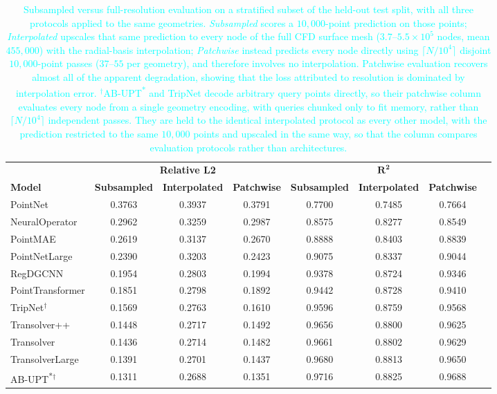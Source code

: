 \begin{table}[h!]
\centering
\small
\caption{\textcolor{cyan}{Subsampled versus full-resolution evaluation on a stratified subset of the
held-out test split, with all three protocols applied to the same geometries. \emph{Subsampled}
scores a $10{,}000$-point prediction on those points; \emph{Interpolated} upscales that same
prediction to every node of the full CFD surface mesh ($3.7$--$5.5\times10^{5}$ nodes, mean
$455{,}000$) with the radial-basis interpolation;
\emph{Patchwise} instead predicts every node directly using $\lceil N/10^4 \rceil$ disjoint
$10{,}000$-point passes ($37$--$55$ per geometry), and therefore involves no interpolation.
Patchwise evaluation recovers almost all of the apparent degradation, showing that the loss attributed to resolution is dominated by interpolation error.
$^{\dagger}$AB-UPT\textsuperscript{*} and TripNet decode arbitrary query points directly, so their
patchwise column evaluates every node from a single geometry encoding, with queries chunked only to
fit memory, rather than $\lceil N/10^4 \rceil$ independent passes. They are held to the identical
interpolated protocol as every other model, with the prediction restricted to the same $10{,}000$
points and upscaled in the same way, so that the column compares evaluation protocols rather than
architectures.}}
\label{tab:surface_fullmesh_comparison}
\setlength{\tabcolsep}{6pt}
\renewcommand{\arraystretch}{1.1}
\begin{tabular}{lccccccc}
\toprule
& \multicolumn{3}{c}{\textbf{Relative L2}} & \multicolumn{3}{c}{$\mathbf{R^2}$} \\
\cmidrule(lr){2-4}\cmidrule(lr){5-7}
\textbf{Model} & \textbf{Subsampled} & \textbf{Interpolated} & \textbf{Patchwise}
               & \textbf{Subsampled} & \textbf{Interpolated} & \textbf{Patchwise} \\
\midrule
PointNet & 0.3763 & 0.3937 & 0.3791 & 0.7700 & 0.7485 & 0.7664 \\
NeuralOperator & 0.2962 & 0.3259 & 0.2987 & 0.8575 & 0.8277 & 0.8549 \\
PointMAE & 0.2619 & 0.3137 & 0.2670 & 0.8888 & 0.8403 & 0.8839 \\
PointNetLarge & 0.2390 & 0.3203 & 0.2423 & 0.9075 & 0.8337 & 0.9044 \\
RegDGCNN & 0.1954 & 0.2803 & 0.1994 & 0.9378 & 0.8724 & 0.9346 \\
PointTransformer & 0.1851 & 0.2798 & 0.1892 & 0.9442 & 0.8728 & 0.9410 \\
TripNet$^{\dagger}$ & 0.1569 & 0.2763 & 0.1610 & 0.9596 & 0.8759 & 0.9568 \\
Transolver++ & 0.1448 & 0.2717 & 0.1492 & 0.9656 & 0.8800 & 0.9625 \\
Transolver & 0.1436 & 0.2714 & 0.1482 & 0.9661 & 0.8802 & 0.9629 \\
TransolverLarge & 0.1391 & 0.2701 & 0.1437 & 0.9680 & 0.8813 & 0.9650 \\
AB-UPT\textsuperscript{*}$^{\dagger}$ & 0.1311 & 0.2688 & 0.1351 & 0.9716 & 0.8825 & 0.9688 \\
\bottomrule
\end{tabular}
\end{table}
